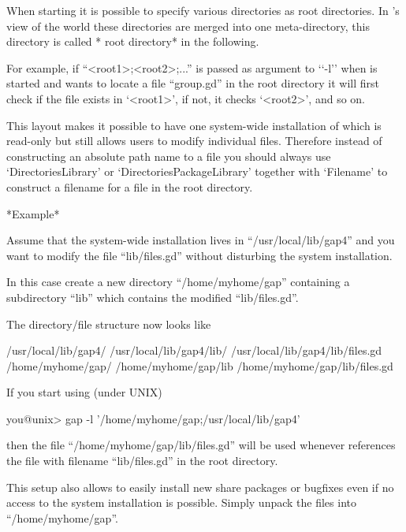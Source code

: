 
When   starting {\GAP} it is possible   to specify various directories as
root directories.  In  {\GAP}'s view of  the world these  directories are
merged  into one meta-directory, this  directory  is called *{\GAP}  root
directory* in the following.

For example,  if  ``<root1>;<root2>;...''    is  passed as   argument  to
`{`-l'}' when   {\GAP} is started   and  {\GAP} wants  to locate  a  file
``group.gd'' in the {\GAP} root directory it will first check if the file
exists in `<root1>', if not, it checks `<root2>', and so on.

This layout makes  it possible to  have one  system-wide  installation of
{\GAP}  which is read-only  but still  allows users  to modify individual
files.  Therefore instead of constructing an absolute path name to a file
you should always use `DirectoriesLibrary' or `DirectoriesPackageLibrary'
together with `Filename' to construct a filename for a file in the {\GAP}
root directory.

*Example*

Assume that the system-wide installation lives in ``/usr/local/lib/gap4''
and you want  to modify the  file ``lib/files.gd'' without disturbing the
system installation.

In  this case create  a  new directory ``/home/myhome/gap'' containing  a
subdirectory ``lib'' which contains the modified ``lib/files.gd''.

The directory/file structure now looks like

\begintt
    /usr/local/lib/gap4/
    /usr/local/lib/gap4/lib/
    /usr/local/lib/gap4/lib/files.gd
    /home/myhome/gap/
    /home/myhome/gap/lib
    /home/myhome/gap/lib/files.gd
\endtt


If you start {\GAP} using (under UNIX)

\begintt
    you@unix> gap -l '/home/myhome/gap;/usr/local/lib/gap4'
\endtt

then the  file  ``/home/myhome/gap/lib/files.gd'' will  be  used whenever
{\GAP} references the  file with filename  ``lib/files.gd'' in the {\GAP}
root directory.

This setup also  allows to easily install  new share packages or bugfixes
even if no access to the system {\GAP} installation  is possible.  Simply
unpack the files into ``/home/myhome/gap''.


